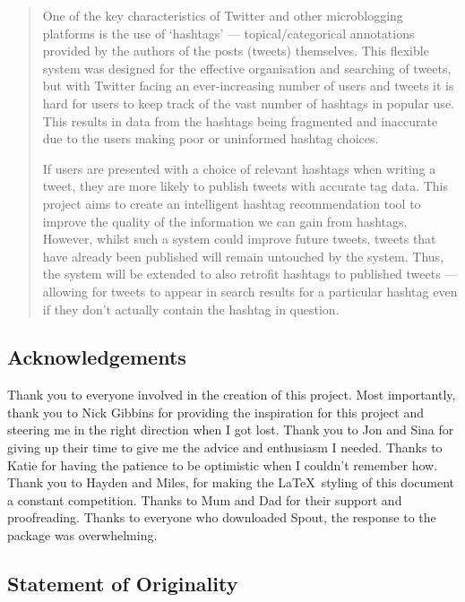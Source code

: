 \documentclass[11pt,a4paper]{report}
\begin{document}
\begin{abstract}
One of the key characteristics of Twitter and other microblogging platforms is the use of `hashtags' --- topical/categorical annotations provided by the authors of the posts (tweets) themselves. This flexible system was designed for the effective organisation and searching of tweets, but with Twitter facing an ever-increasing number of users and tweets it is hard for users to keep track of the vast number of hashtags in popular use. This results in data from the hashtags being fragmented and inaccurate due to the users making poor or uninformed hashtag choices.

If users are presented with a choice of relevant hashtags when writing a tweet, they are more likely to publish tweets with accurate tag data. This project aims to create an intelligent hashtag recommendation tool to improve the quality of the information we can gain from hashtags. However, whilst such a system could improve future tweets, tweets that have already been published will remain untouched by the system. Thus, the system will be extended to also retrofit hashtags to published tweets --- allowing for tweets to appear in search results for a particular hashtag even if they don't actually contain the hashtag in question.

\end{abstract}
\pagebreak

\tableofcontents

\pagebreak

\subsection*{Acknowledgements}
Thank you to everyone involved in the creation of this project. Most importantly, thank you to Nick Gibbins for providing the inspiration for this project and steering me in the right direction when I got lost. Thank you to Jon and Sina for giving up their time to give me the advice and enthusiasm I needed. Thanks to Katie for having the patience to be optimistic when I couldn't remember how. Thank you to Hayden and Miles, for making the \LaTeX\ styling of this document a constant competition. Thanks to Mum and Dad for their support and proofreading. Thanks to everyone who downloaded Spout, the response to the package was overwhelming.

\subsection*{Statement of Originality}
\end{document}
